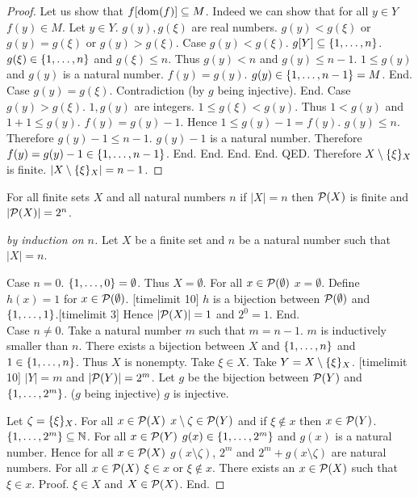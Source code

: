\documentclass{article}
\begin{document}
\begin{forthel}
\begin{proof}
      Let us show that $f[\operatorname{dom}(f)] \subseteq M$.
      Indeed we can show that for all $y \in Y$ $f(y) \in M$.
        Let $y \in Y$.
        $g(y),g(\xi)$ are real numbers.
        $g(y) < g(\xi)$ or $g(y) = g(\xi)$ or $g(y) > g(\xi)$.
        Case $g(y) < g(\xi)$. $g[Y] \subseteq \{1,\dots,n\}$. $g(\xi) \in \{1,\dots,n\}$ and $g(\xi) \leq n$. Thus $g(y) < n$ and $g(y) \leq n-1$. 
          $1 \leq g(y)$ and $g(y)$ is a natural number.
          $f(y) = g(y)$. $g(y) \in \{1,\dots,n-1\} = M$. End.
        Case $g(y) = g(\xi)$. Contradiction (by $g$ being injective). End.
        Case $g(y) > g(\xi)$. $1,g(y)$ are integers. $1 \leq g(\xi) < g(y)$. Thus $1 < g(y)$ and $1+1 \leq g(y)$.
          $f(y) = g(y) - 1$. Hence $1 \leq g(y) - 1 = f(y)$. 
          $g(y) \leq n$. Therefore $g(y) - 1 \leq n - 1$. $g(y) - 1$ is a natural number.
          Therefore $f(y) = g(y)-1 \in \{1,\dots,n-1\}$. End.
      End.
    End.
  End.
QED.
Therefore $X \setminus \{\xi\}_{X}$ is finite. $|X \setminus \{\xi\}_{X}| = n - 1$.
\end{proof}

\begin{theorem}
For all finite sets $X$ and all natural numbers $n$ if $|X| = n$ then
  ${\cal P}(X)$ is finite and $|{\cal P}(X)| = 2^{n}$.
\end{theorem}
\begin{proof}[by induction on $n$]
Let $X$ be a finite set and $n$ be a natural number such that $|X| = n$.

Case $n = 0$. $\{1,\dots,0\} = \emptyset$. Thus $X = \emptyset$. 
  For all $x \in {\cal P}(\emptyset)$ $x = \emptyset$. 
  Define $h(x) = 1$ for $x \in {\cal P}(\emptyset)$. 
  [timelimit 10] $h$ is a bijection between ${\cal P}(\emptyset)$ and $\{1,\dots,1\}$.[timelimit 3]
  Hence $|{\cal P}(X)| = 1$ and $2^{0} = 1$. End.\\

Case $n \neq 0$. Take a natural number $m$ such that $m = n - 1$. $m$ is inductively smaller than $n$.
  There exists a bijection between $X$ and $\{1,\dots,n\}$ and $1 \in \{1,\dots,n\}$. Thus $X$ is nonempty.
  Take $\xi \in X$. Take $Y = X \setminus \{\xi\}_{X}$.
  [timelimit 10] $|Y| = m$ and $|{\cal P}(Y)| = 2^{m}$.
  Let $g$ be the bijection between ${\cal P}(Y)$ and $\{1,\dots,2^{m}\}$. ($g$ being injective) $g$ is injective.
  
  Let $\zeta = \{\xi\}_{X}$. For all $x \in {\cal P}(X)$ $x \setminus \zeta \in {\cal P}(Y)$ and if $\xi \notin x$ then $x \in {\cal P}(Y)$. 
  $\{1,\dots,2^{m}\} \subseteq \mathbb{N}$.
  For all $x \in {\cal P}(Y)$ $g(x) \in \{1,\dots,2^{m}\}$ and $g(x)$ is a natural number.
  Hence for all $x \in {\cal P}(X)$ $g(x \setminus \zeta)$, $2^{m}$ and $2^{m} + g(x \setminus \zeta)$ are natural numbers.
  For all $x \in {\cal P}(X)$ $\xi \in x$ or $\xi \notin x$.
  There exists an $x \in {\cal P}(X)$ such that $\xi \in x$.
  Proof. $\xi \in X$ and $X \in {\cal P}(X)$. End.


\end{proof}
\end{forthel}
\end{document}
